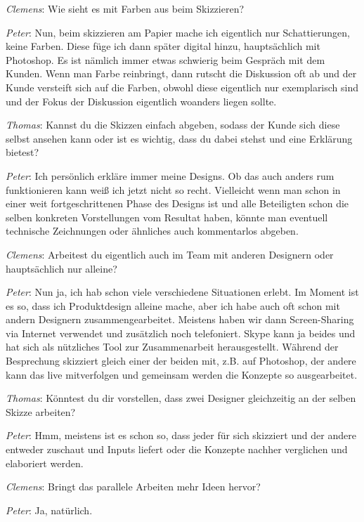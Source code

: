 \medskip \emph{Clemens}: Wie sieht es mit Farben aus beim Skizzieren?

\medskip \emph{Peter}: Nun, beim skizzieren am Papier mache ich eigentlich nur Schattierungen, keine Farben. Diese füge ich dann später digital hinzu, hauptsächlich mit Photoshop. Es ist nämlich immer etwas schwierig beim Gespräch mit dem Kunden. Wenn man Farbe reinbringt, dann rutscht die Diskussion oft ab und der Kunde versteift sich auf die Farben, obwohl diese eigentlich nur exemplarisch sind und der Fokus der Diskussion eigentlich woanders liegen sollte.

\medskip \emph{Thomas}: Kannst du die Skizzen einfach abgeben, sodass der Kunde sich diese selbst ansehen kann oder ist es wichtig, dass du dabei stehst und eine Erklärung bietest?

\medskip \emph{Peter}: Ich persönlich erkläre immer meine Designs. Ob das auch anders rum funktionieren kann weiß ich jetzt nicht so recht. Vielleicht wenn man schon in einer weit fortgeschrittenen Phase des Designs ist und alle Beteiligten schon die selben konkreten Vorstellungen vom Resultat haben, könnte man eventuell technische Zeichnungen oder ähnliches auch kommentarlos abgeben.

\medskip \emph{Clemens}: Arbeitest du eigentlich auch im Team mit anderen Designern oder hauptsächlich nur alleine?

\medskip \emph{Peter}: Nun ja, ich hab schon viele verschiedene Situationen erlebt. Im Moment ist es so, dass ich Produktdesign alleine mache, aber ich habe auch oft schon mit andern Designern zusammengearbeitet. Meistens haben wir dann Screen-Sharing via Internet verwendet und zusätzlich noch telefoniert. Skype kann ja beides und hat sich als nützliches Tool zur Zusammenarbeit herausgestellt. Während der Besprechung skizziert gleich einer der beiden mit, z.B. auf Photoshop, der andere kann das live mitverfolgen und gemeinsam werden die Konzepte so ausgearbeitet. 

\medskip \emph{Thomas}: Könntest du dir vorstellen, dass zwei Designer gleichzeitig an der selben Skizze arbeiten?

\medskip \emph{Peter}: Hmm, meistens ist es schon so, dass jeder für sich skizziert und der andere entweder zuschaut und Inputs liefert oder die Konzepte nachher verglichen und elaboriert werden.

\medskip \emph{Clemens}: Bringt das parallele Arbeiten mehr Ideen hervor?

\medskip \emph{Peter}: Ja, natürlich.

